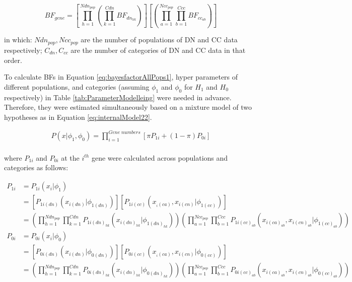 \documentclass[]{article}
\begin{document}
\begin{equation} \label{eq:bayesfactorAllPops1}
BF_{gene} = \left[ \prod \limits_{h=1}^{Ndn_{pop}} (\prod \limits_{k=1}^{Cdn}
  BF_{dn_{hk}}) \right]
\left[ (\prod \limits_{a=1}^{Ncc_{pop}} \prod \limits_{b=1}^{Ccc}
  BF_{cc_{ab}}) \right]
\end{equation}

in which: $Ndn_{pop}, Ncc_{pop}$ are the number of populations of DN
and CC data respectively; $C_{dn}, C_{cc}$ are the number of
categories of DN and CC data in that order.

To calculate BFs in Equation \ref{eq:bayesfactorAllPops1}, hyper
parameters of different populations, and categories (assuming $\phi_1$ and $\phi_0$ for $H_1$
and $H_0$ respectively)  in Table
\ref{tab:ParameterModelleing} were needed in advance. Therefore, they
were estimated simultaneously based on a mixture model of two
hypotheses as in Equation \ref{eq:internalModel22}.

\begin{equation}
\label{eq:internalModel22}
\begin{array}{l}
P(x|\phi_1, \phi_0)  = \prod \limits_{i=1}^{Gene\; numbers} \left[ \pi P_{1i} +
 (1 -                  \pi) P_{0i} \right] \\
\end{array}
\end{equation}

where $P_{1i}$ and $P_{0i}$ at the $i^{th}$ gene were calculated across populations and
categories as follows:


\[
\begin{array}{ll}
P_{1i} & = P_{1i}(x_i|\phi_1) \\
& = \left[ P_{1i(dn)}(x_{i(dn)}|\phi_{1(dn)}) \right] \left[
  P_{1i(cc)}(x_{_i(ca)}, x_{i(cn)}|\phi_{1(cc)}) \right] \\
& = \left( \prod \limits_{h=1}^{Ndn_{pop}}
                      \prod \limits_{k=1}^{Cdn} P_{1i(dn)_{hk}}(x_{i(dn)_{hk}}|\phi_{1(dn)_{hk}}) \right)
                      \left( \prod \limits_{a=1}^{Ncc_{pop}}
                      \prod \limits_{b=1}^{Ccc} P_{1i(cc)_{ab}}(x_{i(ca)_{ab}},x_{i(cn)_{ab}}|\phi_{1(cc)_{ab}})
  \right) \\
P_{0i} & = P_{0i}(x_i|\phi_0) \\
& = \left[ P_{0i(dn)}(x_{i(dn)}|\phi_{0(dn)}) \right] \left[
  P_{0i(cc)}(x_{_i(ca)}, x_{i(cn)}|\phi_{0(cc)}) \right] \\
& = \left( \prod \limits_{h=1}^{Ndn_{pop}}
                      \prod \limits_{k=1}^{Cdn} P_{0i(dn)_{hk}}(x_{i(dn)_{hk}}|\phi_{0(dn)_{hk}}) \right)
                      \left( \prod \limits_{a=1}^{Ncc_{pop}}
                      \prod \limits_{b=1}^{Ccc} P_{0i(cc)_{ab}}(x_{i(ca)_{ab}},x_{i(cn)_{ab}}|\phi_{0(cc)_{ab}})
  \right) \\

\end{array}
\]
\end{document}
